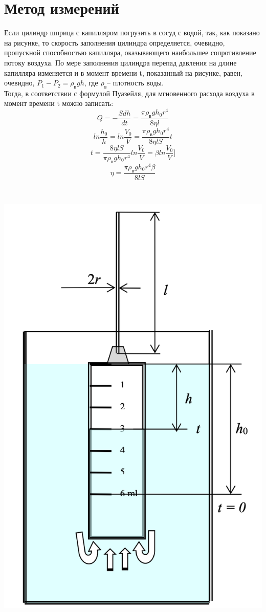 \section{Метод измерений}
\begin{minipage}{0.45\textwidth} 
Если цилиндр шприца с капилляром погрузить в сосуд с водой, так, как показано на рисунке, то скорость заполнения цилиндра определяется, очевидно, пропускной способностью капилляра, оказывающего наибольшее сопротивление потоку воздуха. По мере заполнения цилиндра перепад давления на длине капилляра изменяется и в момент времени t, показанный на рисунке, равен, очевидно, $P_1 - P_2 = \rho_в gh$, где $\rho_в$– плотность воды.\\
Тогда, в соответствии с формулой Пуазейля, для мгновенного расхода воздуха в момент времени t можно записать: \[ Q = -\frac{Sdh}{dt} = \frac{\pi\rho_вgh_0r^4}{8\eta l}\] \[ ln\frac{h_0}{h} = ln\frac{V_0}{V} = \frac{\pi\rho_вgh_0r^4}{8\eta lS}t\] \[ t =\frac{8\eta lS}{\pi\rho_вgh_0r^4} ln\frac{V_0}{V} = \beta ln\frac{V_0}{V} ]\] \[\eta =  \frac{\pi\rho_вgh_0r^4\beta}{8 lS} \]
\end{minipage}
\begin{minipage}{0.07\textwidth}
\
\end{minipage}
\begin{minipage}{0.45\textwidth}
\includegraphics[width=\linewidth]{2.jpg}\\
\end{minipage}
\newpage
